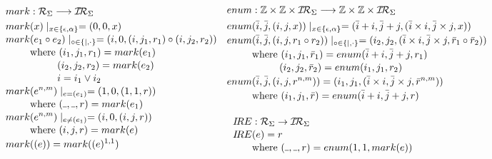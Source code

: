 \documentclass[AMA,STIX1COL]{WileyNJD-v2}
\newcommand{\Xund}{\rule{.4em}{.4pt}}
\newcommand{\XI}{\mathcal{I}}
\newcommand{\XIR}{\XI\!\XR}
\newcommand{\XR}{\mathcal{R}}
\newcommand{\YZ}{\mathbb{Z}}
\newcommand{\IRE}{I\!RE}
\begin{document}
    \begin{align*}
    &\begin{aligned}
        mark &: \XR_\Sigma \longrightarrow \XIR_\Sigma \\
        mark &(x) \mid_{x \in \{\epsilon, \alpha\}} = (0, 0, x) \\[-0.2em]
        mark &(e_1 \circ e_2) \mid_{\circ \in \{|,\cdot\}} = (i, 0,
            (i, j_1, r_1) \circ
            (i, j_2, r_2)
            ) \\[-0.2em]
            &\text{where }            (i_1, j_1, r_1) = mark(e_1) \\[-0.2em]
            &\space{\hphantom{where }}(i_2, j_2, r_2) = mark(e_2) \\[-0.2em]
            &\space{\hphantom{where }}i = i_1 \vee i_2 \\[-0.2em]
        mark &(e^{n, m}) \mid_{e = (e_1)} = (1, 0, (1, 1, r)) \\[-0.2em]
            &\text{where } (\Xund, \Xund, r) = mark(e_1) \\[-0.2em]
        mark &(e^{n, m}) \mid_{e \neq (e_1)} = (i, 0, (i, j, r)) \\[-0.2em]
            &\text{where } (i, j, r) = mark(e) \\[-0.2em]
        mark &((e)) = mark((e)^{1, 1})
    \end{aligned}
    &&\begin{aligned}
        enum &: \YZ \times \YZ \times \XIR_\Sigma \longrightarrow \YZ \times \YZ \times \XIR_\Sigma \\
        enum &(\bar{i}, \bar{j}, (i, j, x)) \mid_{x \in \{\epsilon, \alpha\}}
            = (\bar{i} + i, \bar{j} + j, (\bar{i} \times i, \bar{j} \times j, x))
        \\[-0.2em]
        enum &(\bar{i}, \bar{j}, (i, j, r_1 \circ r_2)) \mid_{\circ \in \{|,\cdot\}}
            = (i_2, j_2, (\bar{i} \times i, \bar{j} \times j, \bar{r}_1 \circ \bar{r}_2)) \\[-0.2em]
            &\text{where }            (i_1, j_1, \bar{r}_1) = enum(\bar{i} + i, \bar{j} + j, r_1) \\[-0.2em]
            &\space{\hphantom{where }}(i_2, j_2, \bar{r}_2) = enum(i_1, j_1, r_2)
        \\[-0.2em]
        enum &(\bar{i}, \bar{j}, (i, j, r^{n,m})) = (i_1, j_1, (\bar{i} \times i, \bar{j} \times j, \bar{r}^{n,m})) \\[-0.2em]
            &\text{where }
                (i_1, j_1, \bar{r}) = enum(\bar{i} + i, \bar{j} + j, r)
        \\[-0.2em]
        \\[-0.2em]
        \IRE &: \XR_\Sigma \rightarrow \XIR_\Sigma \\[-0.2em]
        \IRE&(e) = r \\[-0.2em]
            &\text{where }(\Xund, \Xund, r) = enum(1, 1, mark(e))
        \\[-0.2em]
    \end{aligned}
    \end{align*}
    \medskip
\end{document}
